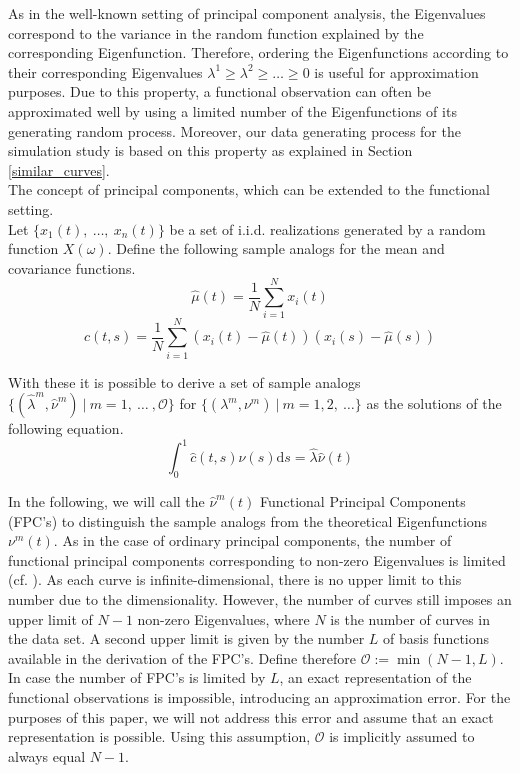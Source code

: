 \documentclass[11pt,twoside,a4paper]{article}
\begin{document}
	As in the well-known setting of principal component analysis, the Eigenvalues correspond to the variance in the random function explained by the corresponding Eigenfunction. 
	Therefore, ordering the Eigenfunctions according to their corresponding Eigenvalues $\lambda^{1} \geq \lambda^{2} \geq \dots \geq 0$ is useful for approximation purposes. Due to this property, a functional observation can often be approximated well by using a limited number of the Eigenfunctions of its generating random process. Moreover, our data generating process for the simulation study is based on this property as explained in Section \ref{similar_curves}.\\
	The concept of principal components, which can be extended to the functional setting.\\
	Let $\{x_1(t),\: \dots, \: x_n(t)\}$ be a set of i.i.d. realizations generated by a random function $X(\omega)$.	Define the following sample analogs for the mean and covariance functions.
	\begin{equation}
		\hat{\mu}(t) = \frac{1}{N}\sum_{i = 1}^{N}x_i(t)
	\end{equation}
	\begin{equation}
		\hat{c}(t,s) = \frac{1}{N} \sum_{i = 1}^{N} \left(x_i(t) - \hat{\mu}(t)\right) \left(x_i(s) - \hat{\mu}(s)\right)
	\end{equation}

	\newpage
	With these it is possible to derive a set of sample analogs $\{(\hat{\lambda}^m, \hat{\nu}^m) \: \vert \: m = 1,\: \dots\:, \mathcal{O}\}$ for $\{(\lambda^m, \nu^m) \: \vert \: m = 1, 2, \:\dots\}$ as the solutions of the following equation. 
	\begin{equation}
		\int_{0}^{1}\hat{c}(t,s)\hat{\nu}(s) \mathrm{d}s = \hat{\lambda} \hat{\nu}(t)
	\end{equation}

	In the following, we will call the $\hat{\nu}^m(t)$ Functional Principal Components (FPC's) to distinguish the sample analogs from the theoretical Eigenfunctions $\nu^m(t)$. As in the case of ordinary principal components, the number of functional principal components corresponding to non-zero Eigenvalues is limited (cf. \cite{ramsay_functional_2005}). As each curve is infinite-dimensional, there is no upper limit to this number due to the dimensionality. However, the number of curves still imposes an upper limit of $N-1$ non-zero Eigenvalues, where $N$ is the number of curves in the data set. A second upper limit is given by the number $L$ of basis functions available in the derivation of the FPC's. Define therefore $\mathcal{O} := \min(N-1, L)$.
	In case the number of FPC's is limited by $L$, an exact representation of the functional observations is impossible, introducing an approximation error. For the purposes of this paper, we will not address this error and assume that an exact representation is possible. Using this assumption, $\mathcal{O}$ is implicitly assumed to always equal $N-1$.
	
\end{document}
